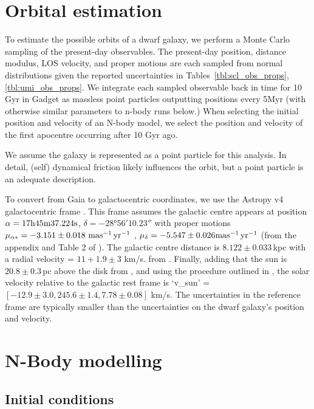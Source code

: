 \section{Orbital estimation}\label{orbital-estimation}

To estimate the possible orbits of a dwarf galaxy, we perform a Monte
Carlo sampling of the present-day observables. The present-day position,
distance modulus, LOS velocity, and proper motions are each sampled from
normal distributions given the reported uncertainties in
Tables~\ref{tbl:scl_obs_props}, \ref{tbl:umi_obs_props}. We integrate
each sampled observable back in time for 10 Gyr in Gadget as massless
point particles outputting positions every 5Myr (with otherwise similar
parameters to n-body runs below.) When selecting the initial position
and velocity of an N-body model, we select the position and velocity of
the first apocentre occurring after 10 Gyr ago.

We assume the galaxy is represented as a point particle for this
analysis. In detail, (self) dynamical friction likely influences the
orbit, but a point particle is an adequate description.

To convert from Gaia to galactocentric coordinates, we use the Astropy
v4 galactocentric frame \citep{astropycollaboration+2022}. This frame
assumes the galactic centre appears at position
\(\alpha = {\rm 17h45m37.224s}\), \(\delta = -28°56'10.23''\) with
proper motions \(\mu_{\alpha*}=-3.151\pm0.018\ {\rm mas^{-1}\,yr^{-1}}\) ,
\(\mu_\delta=-5.547\pm0.026 {\rm mas^{-1}\,yr^{-1}}\) (from the appendix and Table 2 of
\citet{reid+brunthaler2004}). The galactic centre distance is
\(8.122\pm0.033\,\)kpc with a radial velocity = \(11 + 1.9 \pm 3\) km/s.
from \citet{gravitycollaboration+2018}. Finally, adding that the sun is
\(20.8\pm0.3\,\)pc above the disk from \citet{bennett+bovy2019}, and
using the procedure outlined in \citet{drimmel+poggio2018}, the solar
velocity relative to the galactic rest frame is `v\_sun' =
\([-12.9 \pm 3.0, 245.6 \pm 1.4, 7.78 \pm 0.08]\) km/s. The
uncertainties in the reference frame are typically smaller than the
uncertainties on the dwarf galaxy's position and velocity.

\section{N-Body modelling}\label{n-body-modelling}

\subsection{Initial conditions}\label{initial-conditions}

